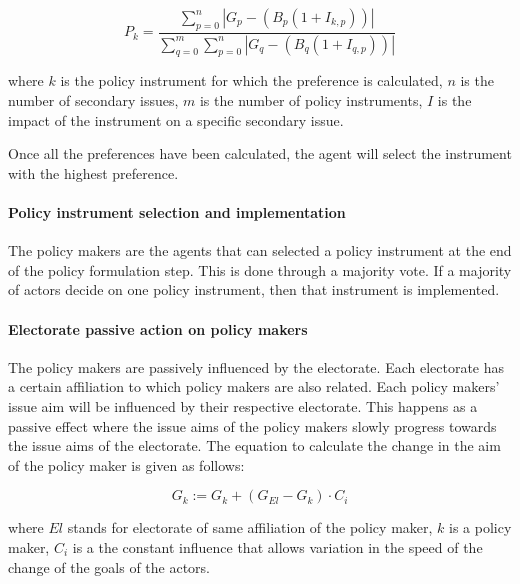 \documentclass[11pt]{article}
\begin{document}
\begin{equation}
P_k = \frac{\sum_{p = 0}^{n} | G_{p} - \left( B_{p} (1 + I_{k,p}) \right) |}{\sum_{q = 0}^{m} \sum_{p = 0}^{n} | G_{q} - \left( B_{q} (1 + I_{q,p}) \right) |}
\end{equation}

where $k$ is the policy instrument for which the preference is calculated, $n$ is the number of secondary issues, $m$ is the number of policy instruments, $I$ is the impact of the instrument on a specific secondary issue.

Once all the preferences have been calculated, the agent will select the instrument with the highest preference.


\paragraph{Policy instrument selection and implementation}

The policy makers are the agents that can selected a policy instrument at the end of the policy formulation step. This is done through a majority vote. If a majority of actors decide on one policy instrument, then that instrument is implemented.


\paragraph{Electorate passive action on policy makers}

The policy makers are passively influenced by the electorate. Each electorate has a certain affiliation to which policy makers are also related. Each policy makers' issue aim will be influenced by their respective electorate. This happens as a passive effect where the issue aims of the policy makers slowly progress towards the issue aims of the electorate. The equation to calculate the change in the aim of the policy maker is given as follows:

\begin{equation}
G_{k} := G_{k} + \left(G_{El} - G_{k} \right) \cdot C_{i}
\end{equation}

where $El$ stands for electorate of same affiliation of the policy maker, $k$ is a policy maker, $C_i$ is a the constant influence that allows variation in the speed of the change of the goals of the actors.
\end{document}
